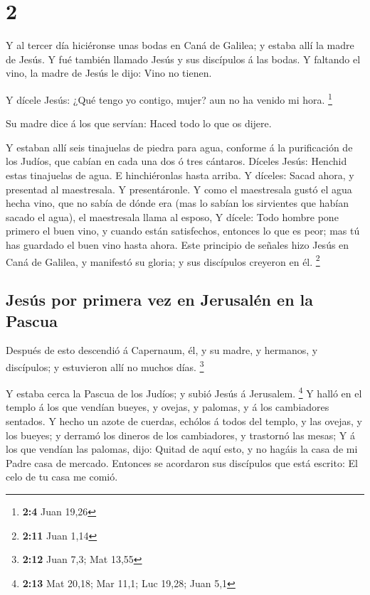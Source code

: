 \hypertarget{section-1}{%
\section{2}\label{section-1}}

 Y al tercer día hiciéronse unas bodas en Caná de Galilea; y
estaba allí la madre de Jesús.  Y fué también llamado Jesús
y sus discípulos á las bodas.  Y faltando el vino, la madre
de Jesús le dijo: Vino no tienen.

 Y dícele Jesús: ¿Qué tengo yo contigo, mujer? aun no ha
venido mi hora. \footnote{\textbf{2:4} Juan 19,26}

 Su madre dice á los que servían: Haced todo lo que os
dijere.

 Y estaban allí seis tinajuelas de piedra para agua,
conforme á la purificación de los Judíos, que cabían en cada una dos ó
tres cántaros.  Díceles Jesús: Henchid estas tinajuelas de
agua. E hinchiéronlas hasta arriba.  Y díceles: Sacad ahora,
y presentad al maestresala. Y presentáronle.  Y como el
maestresala gustó el agua hecha vino, que no sabía de dónde era (mas lo
sabían los sirvientes que habían sacado el agua), el maestresala llama
al esposo,  Y dícele: Todo hombre pone primero el buen
vino, y cuando están satisfechos, entonces lo que es peor; mas tú has
guardado el buen vino hasta ahora.  Este principio de
señales hizo Jesús en Caná de Galilea, y manifestó su gloria; y sus
discípulos creyeron en él. \footnote{\textbf{2:11} Juan 1,14}

\hypertarget{jesuxfas-por-primera-vez-en-jerusaluxe9n-en-la-pascua}{%
\subsection{Jesús por primera vez en Jerusalén en la
Pascua}\label{jesuxfas-por-primera-vez-en-jerusaluxe9n-en-la-pascua}}

 Después de esto descendió á Capernaum, él, y su madre, y
hermanos, y discípulos; y estuvieron allí no muchos días. \footnote{\textbf{2:12}
  Juan 7,3; Mat 13,55}

 Y estaba cerca la Pascua de los Judíos; y subió Jesús á
Jerusalem. \footnote{\textbf{2:13} Mat 20,18; Mar 11,1; Luc 19,28; Juan
  5,1}  Y halló en el templo á los que vendían bueyes, y
ovejas, y palomas, y á los cambiadores sentados.  Y hecho
un azote de cuerdas, echólos á todos del templo, y las ovejas, y los
bueyes; y derramó los dineros de los cambiadores, y trastornó las mesas;
 Y á los que vendían las palomas, dijo: Quitad de aquí
esto, y no hagáis la casa de mi Padre casa de mercado. 
Entonces se acordaron sus discípulos que está escrito: El celo de tu
casa me comió.

